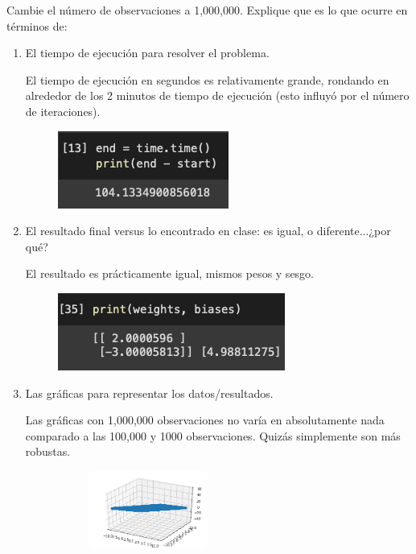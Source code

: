 \begin{problema}
	Cambie el número de observaciones a 1,000,000.  Explique que es lo que ocurre en términos de:
		\begin{enumerate}
		\item El tiempo de ejecución para resolver el problema.
		\begin{sol}
			El tiempo de ejecución en segundos es relativamente grande, rondando en alrededor de los 2 minutos de tiempo de ejecución (esto influyó por el número de iteraciones).
			\begin{figure}[H]
				\centering
				\includegraphics[scale=0.5]{Images/2.3}
			\end{figure}
		\end{sol}
		\item El resultado final versus lo encontrado en clase:  es igual, o diferente...¿por qué?
		\begin{sol}
			El resultado es prácticamente igual, mismos pesos y sesgo. 
			\begin{figure}[H]
				\centering
				\includegraphics[scale=0.5]{Images/2.4}
			\end{figure}
		\end{sol}
		\item Las gráficas  para representar los datos/resultados.
		\begin{sol}
			Las gráficas con 1,000,000 observaciones no varía en absolutamente nada comparado a las 100,000 y 1000 observaciones. Quizás simplemente son más robustas. 
			\begin{figure}[H]
				\centering
				\begin{subfigure}{.5\textwidth}
					\centering
					\includegraphics[width=0.45\textwidth]{Images/2.1}

\end{subfigure}
\end{figure}
\end{sol}
\end{enumerate}
\end{problema}
